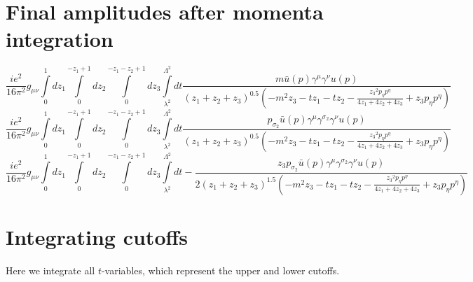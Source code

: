 \section*{Final amplitudes after momenta integration}
\begin{dmath}\frac{i e^{2}}{16 \pi^{2}}g_{ \mu \nu }\int\limits_{ 0 }^{ 1 } d{ z_{ 1 } }\int\limits_{ 0 }^{ - { z_{ 1 } } + 1 } d{ z_{ 2 } }\int\limits_{ 0 }^{ - { z_{ 1 } } - { z_{ 2 } } + 1 } d{ z_{ 3 } }\int\limits_{ \lambda^{2} }^{ \Lambda^{2} } dt\frac{m { \bar{u}(p) } { \gamma^{ \mu } } { \gamma^{ \nu } } u({ p })}{\left({ z_{ 1 } } + { z_{ 2 } } + { z_{ 3 } }\right)^{0.5} \left(- m^{2} { z_{ 3 } } - t { z_{ 1 } } - t { z_{ 2 } } - \frac{{ z_{ 3 } }^{2} { { p }_{ \eta } } { { p }^{ \eta } }}{4 { z_{ 1 } } + 4 { z_{ 2 } } + 4 { z_{ 3 } }} + { z_{ 3 } } { { p }_{ \eta } } { { p }^{ \eta } }\right)}\end{dmath}
\begin{dmath}\frac{i e^{2}}{16 \pi^{2}}g_{ \mu \nu }\int\limits_{ 0 }^{ 1 } d{ z_{ 1 } }\int\limits_{ 0 }^{ - { z_{ 1 } } + 1 } d{ z_{ 2 } }\int\limits_{ 0 }^{ - { z_{ 1 } } - { z_{ 2 } } + 1 } d{ z_{ 3 } }\int\limits_{ \lambda^{2} }^{ \Lambda^{2} } dt\frac{{ { p }_{ \sigma_2 } } { \bar{u}(p) } { \gamma^{ \mu } } { \gamma^{ \sigma_2 } } { \gamma^{ \nu } } u({ p })}{\left({ z_{ 1 } } + { z_{ 2 } } + { z_{ 3 } }\right)^{0.5} \left(- m^{2} { z_{ 3 } } - t { z_{ 1 } } - t { z_{ 2 } } - \frac{{ z_{ 3 } }^{2} { { p }_{ \eta } } { { p }^{ \eta } }}{4 { z_{ 1 } } + 4 { z_{ 2 } } + 4 { z_{ 3 } }} + { z_{ 3 } } { { p }_{ \eta } } { { p }^{ \eta } }\right)}\end{dmath}
\begin{dmath}\frac{i e^{2}}{16 \pi^{2}}g_{ \mu \nu }\int\limits_{ 0 }^{ 1 } d{ z_{ 1 } }\int\limits_{ 0 }^{ - { z_{ 1 } } + 1 } d{ z_{ 2 } }\int\limits_{ 0 }^{ - { z_{ 1 } } - { z_{ 2 } } + 1 } d{ z_{ 3 } }\int\limits_{ \lambda^{2} }^{ \Lambda^{2} } dt- \frac{{ z_{ 3 } } { { p }_{ \sigma_2 } } { \bar{u}(p) } { \gamma^{ \mu } } { \gamma^{ \sigma_2 } } { \gamma^{ \nu } } u({ p })}{2 \left({ z_{ 1 } } + { z_{ 2 } } + { z_{ 3 } }\right)^{1.5} \left(- m^{2} { z_{ 3 } } - t { z_{ 1 } } - t { z_{ 2 } } - \frac{{ z_{ 3 } }^{2} { { p }_{ \eta } } { { p }^{ \eta } }}{4 { z_{ 1 } } + 4 { z_{ 2 } } + 4 { z_{ 3 } }} + { z_{ 3 } } { { p }_{ \eta } } { { p }^{ \eta } }\right)}\end{dmath}
\section*{Integrating cutoffs}
Here we integrate all $t$-variables, which represent the upper and lower cutoffs.
